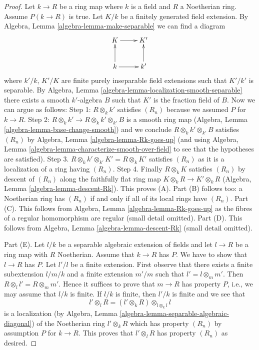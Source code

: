 \documentclass[10pt,a4paper]{amsart}
\theoremstyle{plain}
\theoremstyle{definition}
\theoremstyle{remark}
\numberwithin{equation}{subsection}
\begin{document}
\begin{proof}
Let $k \to R$ be a ring map where $k$ is a field and $R$ a Noetherian
ring. Assume $P(k \to R)$ is true.
Let $K/k$ be a finitely generated field extension.
By Algebra, Lemma \ref{algebra-lemma-make-separable} we can find a diagram
$$
\xymatrix{
K \ar[r] & K' \\
k \ar[u] \ar[r] & k' \ar[u]
}
$$
where $k'/k$, $K'/K$ are finite purely inseparable field
extensions such that $K'/k'$ is separable. By
Algebra, Lemma \ref{algebra-lemma-localization-smooth-separable}
there exists a smooth $k'$-algebra $B$ such that $K'$ is the
fraction field of $B$. Now we can argue as follows:
Step 1: $R \otimes_k k'$ satisfies $(R_n)$ because we assumed $P$
for $k \to R$.
Step 2: $R \otimes_k k' \to R \otimes_k k' \otimes_{k'} B$ is a
smooth ring map (Algebra, Lemma \ref{algebra-lemma-base-change-smooth})
and we conclude $R \otimes_k k' \otimes_{k'} B$ satisfies $(R_n)$
by Algebra, Lemma \ref{algebra-lemma-Rk-goes-up}
(and using Algebra, Lemma \ref{algebra-lemma-characterize-smooth-over-field}
to see that the hypotheses are satisfied).
Step 3. $R \otimes_k k' \otimes_{k'} K' = R \otimes_k K'$ satisfies
$(R_n)$ as it is a localization of a ring having $(R_n)$.
Step 4. Finally $R \otimes_k K$ satisfies $(R_n)$ by descent of
$(R_n)$ along the faithfully flat ring map
$K \otimes_k R \to K' \otimes_k R$
(Algebra, Lemma \ref{algebra-lemma-descent-Rk}).
This proves (A).
Part (B) follows too: a Noetherian ring has $(R_n)$ if and only if
all of its local rings have $(R_n)$.
Part (C). This follows from Algebra, Lemma \ref{algebra-lemma-Rk-goes-up}
as the fibres of a regular homomorphism are regular (small detail omitted).
Part (D). This follows from Algebra, Lemma \ref{algebra-lemma-descent-Rk}
(small detail omitted).

\medskip\noindent
Part (E). Let $l/k$ be a separable algebraic extension of fields and
let $l \to R$ be a ring map with $R$ Noetherian. Assume that
$k \to R$ has $P$. We have to show that $l \to R$ has $P$.
Let $l'/l$ be a finite extension. First observe that there exists a
finite subextension $l/m/k$ and a finite extension $m'/m$
such that $l' = l \otimes_m m'$. Then $R \otimes_l l' = R \otimes_m m'$.
Hence it suffices to prove that $m \to R$ has property $P$, i.e.,
we may assume that $l/k$ is finite. If $l/k$ is finite, then $l'/k$
is finite and we see that
$$
l' \otimes_l R = (l' \otimes_k R) \otimes_{l \otimes_k l} l
$$
is a localization
(by Algebra, Lemma \ref{algebra-lemma-separable-algebraic-diagonal})
of the Noetherian ring $l' \otimes_k R$ which has property $(R_n)$
by assumption $P$ for $k \to R$. This proves that $l' \otimes_l R$
has property $(R_n)$ as desired.
\end{proof}
\end{document}
